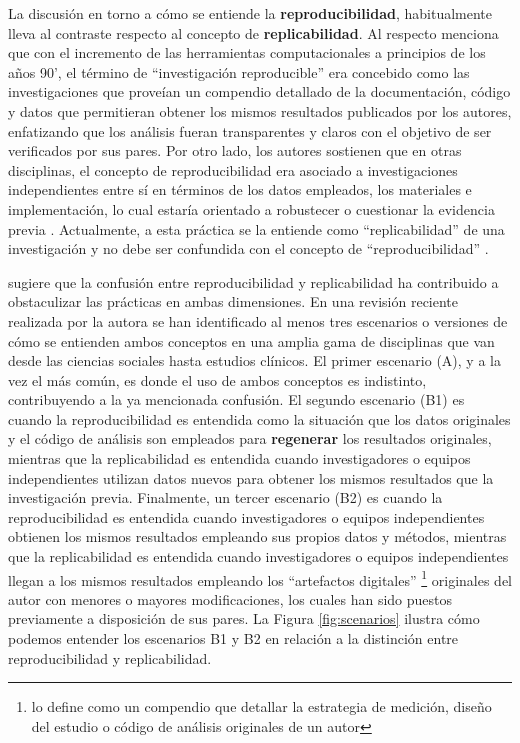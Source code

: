 \documentclass[
]{book}
\begin{document}
La discusión en torno a cómo se entiende la \textbf{reproducibilidad}, habitualmente lleva al contraste respecto al concepto de \textbf{replicabilidad}. Al respecto \citet{earth_Reproducibility_2019} menciona que con el incremento de las herramientas computacionales a principios de los años 90', el término de ``investigación reproducible'' era concebido como las investigaciones que proveían un compendio detallado de la documentación, código y datos que permitieran obtener los mismos resultados publicados por los autores, enfatizando que los análisis fueran transparentes y claros con el objetivo de ser verificados por sus pares. Por otro lado, los autores sostienen que en otras disciplinas, el concepto de reproducibilidad era asociado a investigaciones independientes entre sí en términos de los datos empleados, los materiales e implementación, lo cual estaría orientado a robustecer o cuestionar la evidencia previa \citep[pp 33-34]{earth_Reproducibility_2019}. Actualmente, a esta práctica se la entiende como ``replicabilidad'' de una investigación y no debe ser confundida con el concepto de ``reproducibilidad'' \citep{barba_Terminologies_2018}.

\citet{barba_Terminologies_2018} sugiere que la confusión entre reproducibilidad y replicabilidad ha contribuido a obstaculizar las prácticas en ambas dimensiones. En una revisión reciente realizada por la autora se han identificado al menos tres escenarios o versiones de cómo se entienden ambos conceptos en una amplia gama de disciplinas que van desde las ciencias sociales hasta estudios clínicos. El primer escenario (A), y a la vez el más común, es donde el uso de ambos conceptos es indistinto, contribuyendo a la ya mencionada confusión. El segundo escenario (B1) es cuando la reproducibilidad es entendida como la situación que los datos originales y el código de análisis son empleados para \textbf{regenerar} los resultados originales, mientras que la replicabilidad es entendida cuando investigadores o equipos independientes utilizan datos nuevos para obtener los mismos resultados que la investigación previa. Finalmente, un tercer escenario (B2) es cuando la reproducibilidad es entendida cuando investigadores o equipos independientes obtienen los mismos resultados empleando sus propios datos y métodos, mientras que la replicabilidad es entendida cuando investigadores o equipos independientes llegan a los mismos resultados empleando los ``artefactos digitales'' \footnote{\citet{barba_Terminologies_2018} lo define como un compendio que detallar la estrategia de medición, diseño del estudio o código de análisis originales de un autor} originales del autor con menores o mayores modificaciones, los cuales han sido puestos previamente a disposición de sus pares. La Figura \ref{fig:scenarios} ilustra cómo podemos entender los escenarios B1 y B2 en relación a la distinción entre reproducibilidad y replicabilidad.
\end{document}
